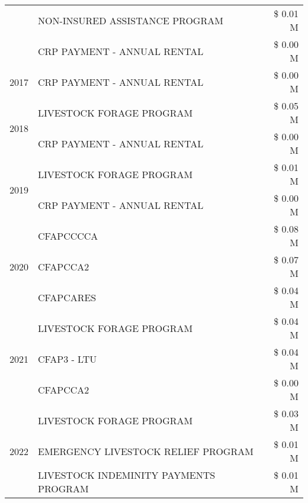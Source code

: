 \begin{tabular}{llr}
 & NON-INSURED ASSISTANCE PROGRAM & \$ 0.01 M \\
 & CRP PAYMENT - ANNUAL RENTAL & \$ 0.00 M \\
\cline{1-3}
2017 & CRP PAYMENT - ANNUAL RENTAL & \$ 0.00 M \\
\cline{1-3}
\multirow[t]{2}{*}{2018} & LIVESTOCK FORAGE PROGRAM & \$ 0.05 M \\
 & CRP PAYMENT - ANNUAL RENTAL & \$ 0.00 M \\
\cline{1-3}
\multirow[t]{2}{*}{2019} & LIVESTOCK FORAGE PROGRAM & \$ 0.01 M \\
 & CRP PAYMENT - ANNUAL RENTAL & \$ 0.00 M \\
\cline{1-3}
\multirow[t]{3}{*}{2020} & CFAPCCCCA & \$ 0.08 M \\
 & CFAPCCA2 & \$ 0.07 M \\
 & CFAPCARES & \$ 0.04 M \\
\cline{1-3}
\multirow[t]{3}{*}{2021} & LIVESTOCK FORAGE PROGRAM & \$ 0.04 M \\
 & CFAP3 - LTU & \$ 0.04 M \\
 & CFAPCCA2 & \$ 0.00 M \\
\cline{1-3}
\multirow[t]{3}{*}{2022} & LIVESTOCK FORAGE PROGRAM & \$ 0.03 M \\
 & EMERGENCY LIVESTOCK RELIEF PROGRAM & \$ 0.01 M \\
 & LIVESTOCK INDEMINITY PAYMENTS PROGRAM & \$ 0.01 M \\
\cline{1-3}
\bottomrule
\end{tabular}
